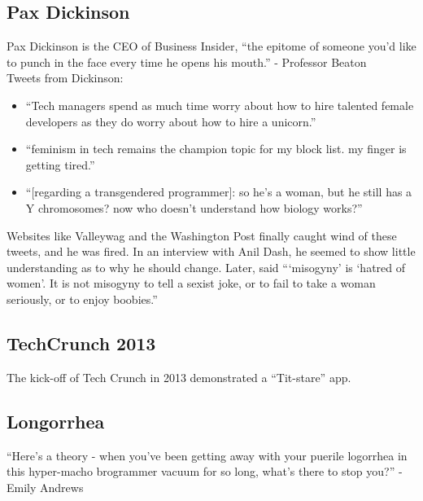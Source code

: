 \documentclass{article}
\begin{document}
\subsection*{Pax Dickinson}
Pax Dickinson is the CEO of Business Insider, ``the epitome of someone you'd
like to punch in the face every time he opens his mouth.'' - Professor Beaton \\
Tweets from Dickinson:
\begin{itemize}
  \item ``Tech managers spend as much time worry about how to hire talented
  female developers as they do worry about how to hire a unicorn.''
  \item ``feminism in tech remains the champion topic for my block list. my
  finger is getting tired.''
  \item ``[regarding a transgendered programmer]: so he's a woman, but he still
  has a Y chromosomes? now who doesn't understand how biology works?''
\end{itemize}
Websites like Valleywag and the Washington Post finally caught wind of these
tweets, and he was fired. In an interview with Anil Dash, he seemed to show
little understanding as to why he should change. Later, said ```misogyny' is
`hatred of women'. It is not misogyny to tell a sexist joke, or to fail to take
a woman seriously, or to enjoy boobies.''

\subsection*{TechCrunch 2013}
The kick-off of Tech Crunch in 2013 demonstrated a ``Tit-stare'' app.

\subsection*{Longorrhea}
``Here's a theory - when you've been getting away with your puerile logorrhea
in this hyper-macho brogrammer vacuum for so long, what's there to stop you?''
- Emily Andrews
\end{document}
